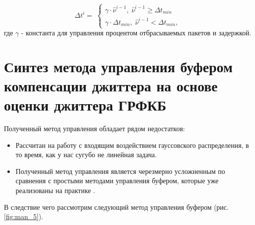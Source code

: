\begin{equation}\label{eq41:syntes5}
\Delta t^i= \;
\begin{cases}
\gamma\cdot\hat{\nu}^{i-1}, \; \hat{\nu}^{i-1} \geq \Delta t_{min} \\    
\gamma\cdot\Delta t_{min}, \;  \hat{\nu}^{i-1} < \Delta t_{min},    
\end{cases}
\end{equation}
\noindent где $\gamma$ - константа для управления процентом отбрасываемых пакетов и задержкой.


\section{Синтез метода управления буфером компенсации джиттера на основе оценки джиттера ГРФКБ}

Полученный метод управления обладает рядом недостатков:
\begin{itemize}
 \item Рассчитан на работу с входящим воздействием гауссовского распределения, в то время, как у нас сугубо не линейная задача.
 \item Полученный метод управления является черезмерно усложненным по сравнения с простыми методами управления буфером, которые уже реализованы на практике \cite{Moon,jesuspinto1999algorithms,YoungJongChoChongKwanUn19941385,DBLP:journals/iet-com/Gade07,Hafskjold:2003:AAO:963600.963677}.  
\end{itemize}

В следствие чего рассмотрим следующий метод управления буфером (рис. \ref{fig:man_5}).

